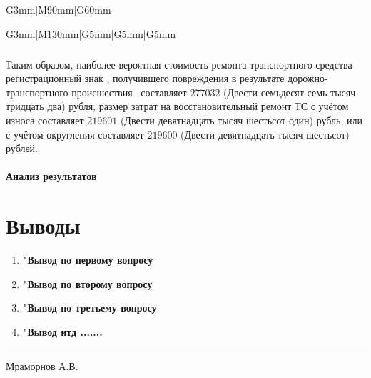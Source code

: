 \begin{longtable}{G{3mm}|M{90mm}|G{60mm}}
\begin{longtable}{G{3mm}|M{130mm}|G{5mm}|G{5mm}|G{5mm}}
		
		\subparagraph{}Таким образом,  наиболее вероятная стоимость ремонта транспортного средства \tc\, регистрационный знак , получившего повреждения в результате дорожно-транспортного происшествия  \, составляет $277 032$ (Двести семьдесят семь тысяч тридцать два) рубля,  размер затрат на восстановительный ремонт ТС с учётом износа составляет  $ 219 601 $ (Двести девятнадцать тысяч шестьсот один) рубль, или с учётом округления составляет $ 219 600 $ (Двести девятнадцать тысяч шестьсот) рублей.
		

%
\paragraph{Анализ результатов}


\section{Выводы}

\begin{enumerate}
	\item \textbf{"Вывод по первому вопросу}\\[3mm]
	\item \textbf{"Вывод по второму вопросу}\\[3mm]
	\item \textbf{"Вывод по третьему вопросу}\\[3mm]
	\item \textbf{"Вывод  итд .......}\\[3mm]
	
	\vspace{5mm}
	
\end{enumerate}
    
\vspace{10mm}
  \hfill    \rule{45mm}{0.1 mm}   {Мраморнов А.В.}\\
\vspace{7mm}
\relax

\vspace{15mm}


\end{longtable}
\end{longtable}
